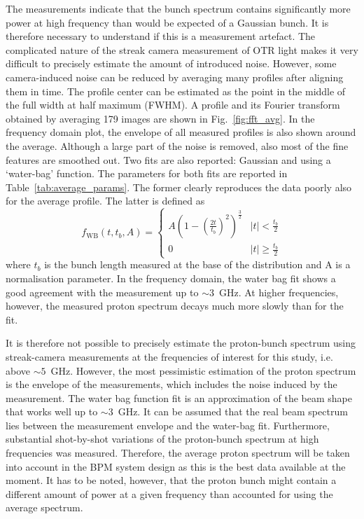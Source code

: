 The measurements indicate that the bunch spectrum contains significantly more power at high frequency than would be expected of a Gaussian bunch. It is therefore necessary to understand if this is a measurement artefact. The complicated nature of the streak camera measurement of OTR light makes it very difficult to precisely estimate the amount of introduced noise. However, some camera-induced noise can be reduced by averaging many profiles after aligning them in time. The profile center can be estimated as the point in the middle of the full width at half maximum (FWHM). A profile and its Fourier transform obtained by averaging 179 images are shown in Fig.~\ref{fig:fft_avg}. In the frequency domain plot, the envelope of all measured profiles is also shown around the average. Although a large part of the noise is removed, also most of the fine features are smoothed out. Two fits are also reported: Gaussian and using a `water-bag' function. The parameters for both fits are reported in Table~\ref{tab:average_params}. The former clearly reproduces the data poorly also for the average profile. The latter is defined as
\begin{equation}
f_\text{WB}(t, t_b, A)=
\begin{cases}
A \left( 1 - \left( \frac{2t}{t_b}   \right)^2  \right)^\frac{3}{2}   & |t| < \frac{t_b}{2}\\
0   &  |t| \ge \frac{t_b}{2}
\end{cases}\label{eq:waterbag}
\end{equation}
where $t_b$ is the bunch length measured at the base of the distribution and A is a normalisation parameter. In the frequency domain, the water bag fit shows a good agreement with the measurement up to $\sim$3~GHz. At higher frequencies, however, the measured proton spectrum decays much more slowly than for the fit. 


It is therefore not possible to precisely estimate the proton-bunch spectrum using streak-camera measurements at the frequencies of interest for this study, i.e. above $\sim 5$~GHz. However, the most pessimistic estimation of the proton spectrum is the envelope of the measurements, which includes the noise induced by the measurement. The water bag function fit is an approximation of the beam shape that works well up to $\sim$3~GHz. It can be assumed that the real beam spectrum lies between the measurement envelope and the water-bag fit. Furthermore, substantial shot-by-shot variations of the proton-bunch spectrum at high frequencies was measured. Therefore, the average proton spectrum will be taken into account in the BPM system design as this is the best data available at the moment. It has to be noted, however, that the proton bunch might contain a different amount of power at a given frequency than  accounted for using the average spectrum. 





